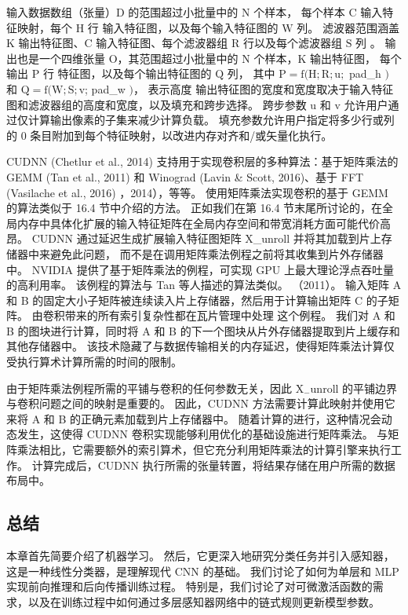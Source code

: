 输入数据数组（张量）$\mathrm{D}$ 的范围超过小批量中的 $\mathrm{N}$ 个样本，
每个样本 $\mathrm{C}$ 输入特征映射，每个 $\mathrm{H}$ 行 输入特征图，以及每个输入特征图的 $\mathrm{W}$ 列。 
滤波器范围涵盖 $\mathrm{K}$ 输出特征图、$\mathrm{C}$ 输入特征图、每个滤波器组 $\mathrm{R}$ 行以及每个滤波器组 $\mathrm{S}$ 列 。 
输出也是一个四维张量 $\mathrm{O}$，其范围超过小批量中的 $\mathrm{N}$ 个样本，$\mathrm{K}$ 输出特征图，
每个输出 $\mathrm{P}$ 行 特征图，以及每个输出特征图的 $\mathrm{Q}$ 列，
其中 $\mathrm{P}=\mathrm{f}(\mathrm{H} ; \mathrm{R} ; \mathrm{u} ;$ pad\_h $)$ 
和 $\mathrm{Q}=\mathrm{f}(\mathrm{W} ; \mathrm{S} ; \mathrm{v}$; pad\_w $)$，
表示高度 输出特征图的宽度和宽度取决于输入特征图和滤波器组的高度和宽度，以及填充和跨步选择。 
跨步参数 $\mathrm{u}$ 和 $\mathrm{v}$ 允许用户通过仅计算输出像素的子集来减少计算负载。 
填充参数允许用户指定将多少行或列的 0 条目附加到每个特征映射，以改进内存对齐和/或矢量化执行。

CUDNN (Chetlur et al., 2014) 支持用于实现卷积层的多种算法：基于矩阵乘法的 GEMM (Tan et al., 2011) 
和 Winograd (Lavin \& Scott, 2016)、基于 FFT (Vasilache et al., 2016) ，2014），等等。 
使用矩阵乘法实现卷积的基于 GEMM 的算法类似于 16.4 节中介绍的方法。 
正如我们在第 16.4 节末尾所讨论的，在全局内存中具体化扩展的输入特征矩阵在全局内存空间和带宽消耗方面可能代价高昂。 
CUDNN 通过延迟生成扩展输入特征图矩阵 X\_unroll 并将其加载到片上存储器中来避免此问题，
而不是在调用矩阵乘法例程之前将其收集到片外存储器中。 
NVIDIA 提供了基于矩阵乘法的例程，可实现 GPU 上最大理论浮点吞吐量的高利用率。 
该例程的算法与 Tan 等人描述的算法类似。 （2011）。 
输入矩阵 A 和 B 的固定大小子矩阵被连续读入片上存储器，然后用于计算输出矩阵 C 的子矩阵。
由卷积带来的所有索引复杂性都在瓦片管理中处理 这个例程。 
我们对 A 和 B 的图块进行计算，同时将 A 和 B 的下一个图块从片外存储器提取到片上缓存和其他存储器中。 
该技术隐藏了与数据传输相关的内存延迟，使得矩阵乘法计算仅受执行算术计算所需的时间的限制。


由于矩阵乘法例程所需的平铺与卷积的任何参数无关，因此 $\mathrm{X}_{-}$unroll 的平铺边界与卷积问题之间的映射是重要的。 
因此，CUDNN 方法需要计算此映射并使用它来将 A 和 B 的正确元素加载到片上存储器中。 
随着计算的进行，这种情况会动态发生，这使得 CUDNN 卷积实现能够利用优化的基础设施进行矩阵乘法。 
与矩阵乘法相比，它需要额外的索引算术，但它充分利用矩阵乘法的计算引擎来执行工作。 
计算完成后，CUDNN 执行所需的张量转置，将结果存储在用户所需的数据布局中。

\subsection{总结}
本章首先简要介绍了机器学习。 然后，它更深入地研究分类任务并引入感知器，这是一种线性分类器，是理解现代 CNN 的基础。 
我们讨论了如何为单层和 MLP 实现前向推理和后向传播训练过程。 
特别是，我们讨论了对可微激活函数的需求，以及在训练过程中如何通过多层感知器网络中的链式规则更新模型参数。

